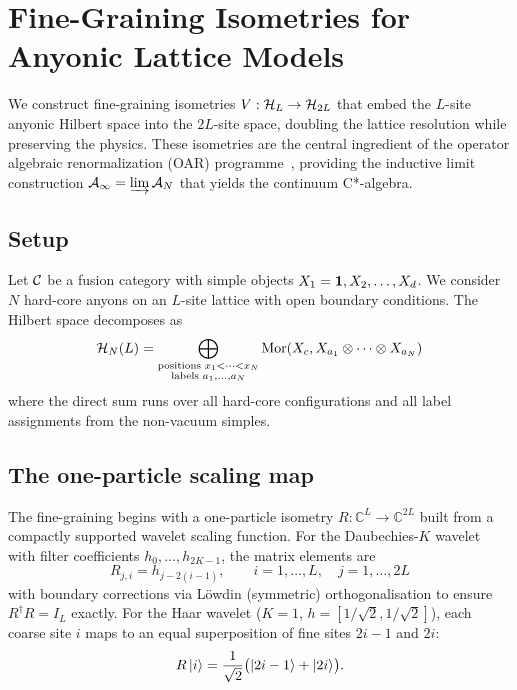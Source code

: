 \section{Fine-Graining Isometries for Anyonic Lattice Models}
\label{sec:finegraining}

We construct fine-graining isometries $V: \mathcal{H}_L \to \mathcal{H}_{2L}$ that embed the $L$-site anyonic Hilbert space into the $2L$-site space, doubling the lattice resolution while preserving the physics. These isometries are the central ingredient of the operator algebraic renormalization (OAR) programme~\cite{OsborneStottmeister2022,Stottmeister2021}, providing the inductive limit construction $\mathcal{A}_\infty = \varinjlim \mathcal{A}_N$ that yields the continuum C*-algebra.

\subsection{Setup}

Let $\mathcal{C}$ be a fusion category with simple objects $X_1 = \mathbf{1}, X_2, \ldots, X_d$. We consider $N$ hard-core anyons on an $L$-site lattice with open boundary conditions. The Hilbert space decomposes as
\begin{equation}
    \mathcal{H}_N(L) = \bigoplus_{\substack{\text{positions } x_1 < \cdots < x_N \\ \text{labels } a_1, \ldots, a_N}} \operatorname{Mor}(X_c, X_{a_1} \otimes \cdots \otimes X_{a_N})
\end{equation}
where the direct sum runs over all hard-core configurations and all label assignments from the non-vacuum simples.

\subsection{The one-particle scaling map}

The fine-graining begins with a one-particle isometry $R: \mathbb{C}^L \to \mathbb{C}^{2L}$ built from a compactly supported wavelet scaling function. For the Daubechies-$K$ wavelet with filter coefficients $h_0, \ldots, h_{2K-1}$, the matrix elements are
\begin{equation}
    R_{j,i} = h_{j - 2(i-1)}, \qquad i = 1, \ldots, L, \quad j = 1, \ldots, 2L
\end{equation}
with boundary corrections via L\"owdin (symmetric) orthogonalisation to ensure $R^\dagger R = I_L$ exactly. For the Haar wavelet ($K=1$, $h = [1/\sqrt{2}, 1/\sqrt{2}]$), each coarse site $i$ maps to an equal superposition of fine sites $2i-1$ and $2i$:
\begin{equation}
    R\ket{i} = \frac{1}{\sqrt{2}}\bigl(\ket{2i-1} + \ket{2i}\bigr).
\end{equation}

